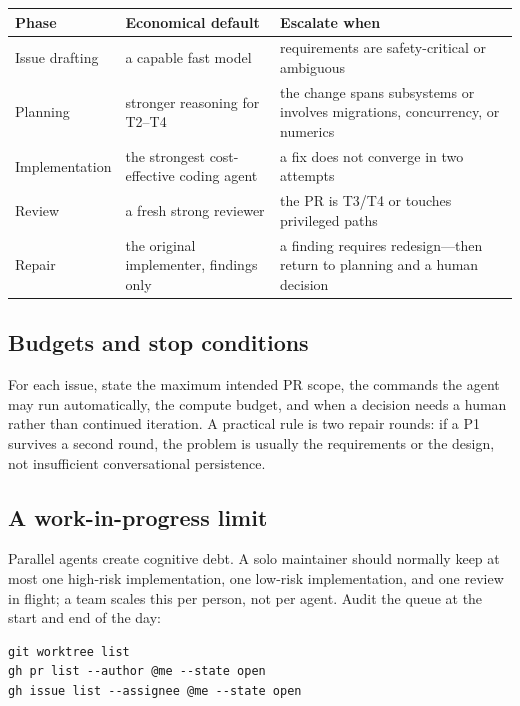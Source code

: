 \documentclass[11pt]{article}
\begin{document}
\begin{center}
\begin{tabularx}{\textwidth}{@{}l Y Y@{}}
\toprule
\textbf{Phase} & \textbf{Economical default} & \textbf{Escalate when} \\
\midrule
Issue drafting & a capable fast model & requirements are safety-critical or ambiguous \\
Planning & stronger reasoning for T2--T4 & the change spans subsystems or involves migrations,
  concurrency, or numerics \\
Implementation & the strongest cost-effective coding agent & a fix does not converge in two
  attempts \\
Review & a fresh strong reviewer & the PR is T3/T4 or touches privileged paths \\
Repair & the original implementer, findings only & a finding requires redesign---then return to
  planning and a human decision \\
\bottomrule
\end{tabularx}
\end{center}

\subsection{Budgets and stop conditions}

For each issue, state the maximum intended PR scope, the commands the agent may run
automatically, the compute budget, and when a decision needs a human rather than continued
iteration. A practical rule is two repair rounds: if a P1 survives a second round, the problem is
usually the requirements or the design, not insufficient conversational persistence.

\subsection{A work-in-progress limit}

Parallel agents create cognitive debt. A solo maintainer should normally keep at most one
high-risk implementation, one low-risk implementation, and one review in flight; a team scales
this per person, not per agent. Audit the queue at the start and end of the day:

\begin{lstlisting}[style=gw]
git worktree list
gh pr list --author @me --state open
gh issue list --assignee @me --state open
\end{lstlisting}
\end{document}
